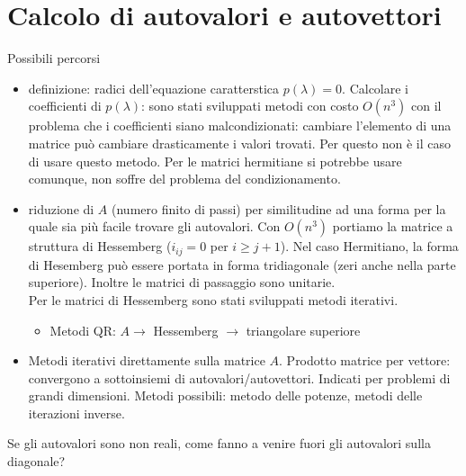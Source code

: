 


\inbpdocument 

\chapter{Calcolo di autovalori e autovettori}

Possibili percorsi

\begin{itemize}

\item definizione: radici dell'equazione caratterstica $p(\lambda)=0$.
Calcolare i coefficienti di $p(\lambda)$: sono stati sviluppati metodi
con costo $O(n^3)$ con il problema che i coefficienti siano
malcondizionati: cambiare l'elemento di una matrice pu\`o cambiare
drasticamente i valori trovati.  Per questo non \`e il caso di usare
questo metodo.  Per le matrici hermitiane si potrebbe usare comunque,
non soffre del problema del condizionamento.

\item riduzione di $A$ (numero finito di passi) per similitudine ad
una forma per la quale sia pi\`u facile trovare gli autovalori.  Con
$O(n^3)$ portiamo la matrice a struttura di Hessemberg ($i_{ij}=0$ per
$i \geq j+1$).  Nel caso Hermitiano, la forma di Hesemberg pu\`o
essere portata in forma tridiagonale (zeri anche nella parte
superiore). Inoltre le matrici di passaggio sono unitarie.
\\
Per le matrici di Hessemberg sono stati sviluppati metodi
iterativi.
\begin{itemize}
 \item Metodi QR: $A \rightarrow$ Hessemberg $\rightarrow$ triangolare
  superiore
\end{itemize}

\item Metodi iterativi direttamente sulla matrice $A$.
  Prodotto matrice per vettore: convergono a sottoinsiemi
  di autovalori/autovettori. Indicati per problemi di grandi
  dimensioni. Metodi possibili: metodo delle potenze,
  metodi delle iterazioni inverse.

\end{itemize}
Se gli autovalori sono non reali, come fanno a venire
fuori gli autovalori sulla diagonale?


